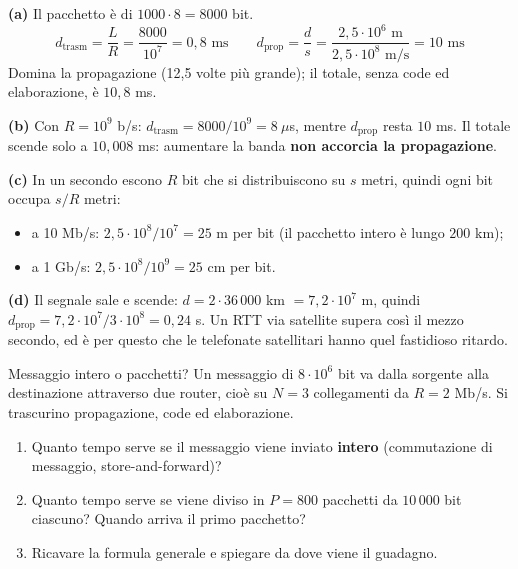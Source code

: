 \svolgimento
\textbf{(a)} Il pacchetto è di $1000 \cdot 8 = 8000$ bit.
$$d_{\text{trasm}} = \frac{L}{R} = \frac{8000}{10^7} = 0{,}8 \text{ ms} \qquad
  d_{\text{prop}} = \frac{d}{s} = \frac{2{,}5 \cdot 10^6 \text{ m}}{2{,}5 \cdot 10^8 \text{ m/s}} = 10 \text{ ms}$$
Domina la propagazione (12,5 volte più grande); il totale, senza code ed elaborazione, è $10{,}8$ ms.

\textbf{(b)} Con $R = 10^9$ b/s: $d_{\text{trasm}} = 8000/10^9 = 8\ \mu$s, mentre $d_{\text{prop}}$ resta $10$ ms. Il totale scende
solo a $10{,}008$ ms: aumentare la banda \textbf{non accorcia la propagazione}.

\textbf{(c)} In un secondo escono $R$ bit che si distribuiscono su $s$ metri, quindi ogni bit occupa $s/R$ metri:
\begin{itemize}
    \item a 10 Mb/s: $2{,}5\cdot 10^8 / 10^7 = 25$ m per bit (il pacchetto intero è lungo $200$ km);
    \item a 1 Gb/s: $2{,}5\cdot 10^8 / 10^9 = 25$ cm per bit.
\end{itemize}

\textbf{(d)} Il segnale sale e scende: $d = 2 \cdot 36\,000$ km $= 7{,}2\cdot 10^7$ m, quindi
$d_{\text{prop}} = 7{,}2\cdot 10^7 / 3\cdot 10^8 = 0{,}24$ s. Un RTT via satellite supera così il mezzo secondo, ed è per questo
che le telefonate satellitari hanno quel fastidioso ritardo.


\begin{esercizio}{Messaggio intero o pacchetti?}
Un messaggio di $8 \cdot 10^6$ bit va dalla sorgente alla destinazione attraverso due router, cioè su $N = 3$ collegamenti
da $R = 2$ Mb/s. Si trascurino propagazione, code ed elaborazione.
\begin{enumerate}[label=(\alph*)]
    \item Quanto tempo serve se il messaggio viene inviato \textbf{intero} (commutazione di messaggio, store-and-forward)?
    \item Quanto tempo serve se viene diviso in $P = 800$ pacchetti da $10\,000$ bit ciascuno? Quando arriva il primo pacchetto?
    \item Ricavare la formula generale e spiegare da dove viene il guadagno.
\end{enumerate}
\end{esercizio}

